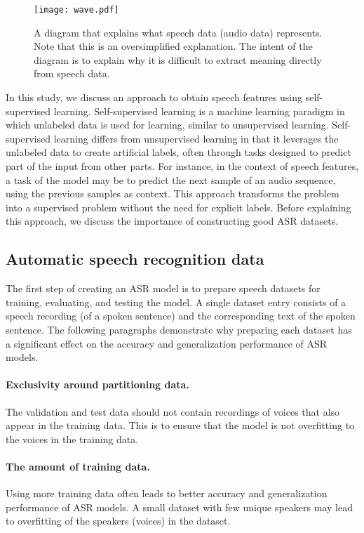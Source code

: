 \newpage

\begin{figure}[!ht]
    \centering
    \texttt{[image: wave.pdf]}
    \caption{A diagram that explains what speech data (audio data) represents. Note that this is an oversimplified explanation. 
    The intent of the diagram is to explain why it is difficult to extract meaning directly from speech data.}
    \label{fig:wave}
\end{figure}

In this study, we discuss an approach to obtain speech features using self-supervised learning.
Self-supervised learning is a machine learning paradigm in which unlabeled data is used for learning, similar to unsupervised learning.
Self-supervised learning differs from unsupervised learning in that it leverages the unlabeled data to create artificial labels, 
often through tasks designed to predict part of the input from other parts. 
For instance, in the context of speech features, a task of the model may be to predict the next sample of an audio sequence, 
using the previous samples as context.
This approach transforms the problem into a supervised problem without the need for explicit labels. 
Before explaining this approach, we discuss the importance of constructing good ASR datasets.

\subsection{Automatic speech recognition data}
The first step of creating an ASR model is to prepare speech datasets for training, evaluating, and testing the model.
A single dataset entry consists of a speech recording (of a spoken sentence) and the corresponding text of the spoken sentence.
The following paragraphs demonstrate why preparing each dataset
has a significant effect on the accuracy and generalization performance of ASR models.

\paragraph*{Exclusivity around partitioning data.}\label{par:excl_split}
The validation and test data should not contain recordings of voices that also appear in the training data.
This is to ensure that the model is not overfitting to the voices in the training data.

\paragraph*{The amount of training data.}
Using more training data often leads to better accuracy and generalization performance of ASR models.
A small dataset with few unique speakers may lead to overfitting of the speakers (voices) in the dataset.

